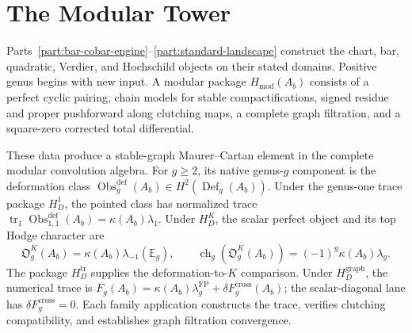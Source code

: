 \documentclass[11pt]{memoir}
\begin{document}
%
%
%
%

\part{The Modular Tower}
\label{part:modular-tower-physics}%
\label{part:modular-tower}%

\noindent
Parts~\ref{part:bar-cobar-engine}--\ref{part:standard-landscape}
construct the chart, bar, quadratic, Verdier, and Hochschild objects
on their stated domains.  Positive genus begins with new input.  A
modular package $H_{\mathrm{mod}}(A_b)$ consists of a perfect cyclic
pairing, chain models for stable compactifications, signed residue and
proper pushforward along clutching maps, a complete graph filtration,
and a square-zero corrected total differential.

These data produce a stable-graph Maurer--Cartan element in the
complete modular convolution algebra.  For $g\geq2$, its native
genus-$g$ component is the deformation class
$\operatorname{Obs}^{\mathrm{def}}_g(A_b)\in
H^2(\operatorname{Def}_g(A_b))$.  Under the genus-one trace package
$H_D^1$, the pointed class has normalized trace
$\operatorname{tr}_1\operatorname{Obs}^{\mathrm{def}}_{1,1}(A_b)
=\kappa(A_b)\lambda_1$.  Under $H_D^K$, the scalar perfect object and
its top Hodge character are
\[
 \mathfrak O_g^K(A_b)=\kappa(A_b)\lambda_{-1}(\mathbb E_g),
 \qquad
 \operatorname{ch}_g\!\left(\mathfrak O_g^K(A_b)\right)
 =(-1)^g\kappa(A_b)\lambda_g.
\]
The package $H_D^{\mathrm{tr}}$ supplies the deformation-to-$K$
comparison.  Under $H_D^{\mathrm{graph}}$, the numerical trace is
$F_g(A_b)=\kappa(A_b)\lambda_g^{\mathrm{FP}}
+\delta F_g^{\mathrm{cross}}(A_b)$; the scalar-diagonal lane has
$\delta F_g^{\mathrm{cross}}=0$.  Each family application constructs
the trace, verifies clutching compatibility, and establishes graph
filtration convergence.
\end{document}
